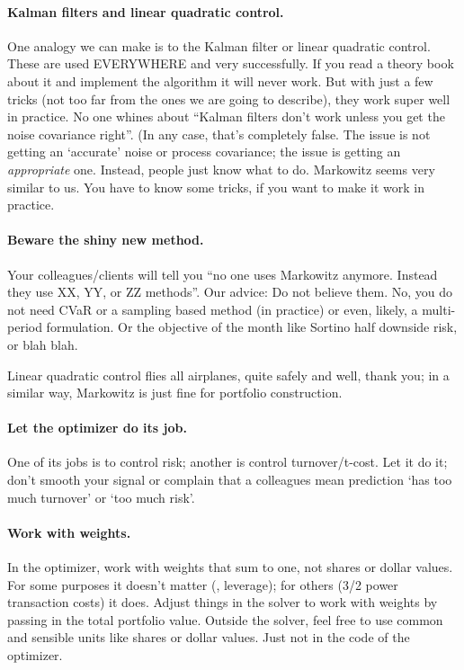 \documentclass[12pt]{article}
\begin{document}
\paragraph{Kalman filters and linear quadratic control.}
One analogy we can make is to the Kalman filter or linear quadratic control.   
These are used EVERYWHERE
and very successfully.  If you read a theory book about it and implement the
algorithm it will never work.  But with just a few tricks (not too far from the
ones we are going to describe), they work super well in practice. No one whines
about “Kalman filters don’t work unless you get the noise covariance right”.
(In any case, that's completely false.  The issue is not getting an `accurate' noise or 
process covariance; the issue is getting an \emph{appropriate} one.
Instead, people just know what to do.   Markowitz seems very similar to us. You
have to know some tricks, if you want to make it work in practice.

\paragraph{Beware the shiny new method.}  Your colleagues/clients will tell you “no one
uses Markowitz anymore. Instead they use XX, YY, or ZZ methods”.  Our advice:
Do not believe them.  No, you do not need CVaR or a sampling based method (in
practice) or even, likely, a multi-period formulation.
Or the objective of the month like Sortino half downside risk, or
blah blah.   

Linear quadratic control flies all airplanes, quite safely and
well, thank you; in a similar way, Markowitz is just fine for portfolio
construction.

\paragraph{Let the optimizer do its job.}   One of its jobs is to
control risk; another is control turnover/t-cost.  Let it do it; don’t smooth your
signal or complain that a colleagues mean prediction `has too much turnover' or `too much risk'. 

\paragraph{Work with weights.}
In the optimizer, work with weights that sum to one, not shares or dollar values.  For
some purposes it doesn’t matter (\eg, leverage); for others (3/2 power transaction
costs) it does.  Adjust things in the solver to work with weights by passing in
the total portfolio value.  Outside the solver, feel free to use common and
sensible units like shares or dollar values.  Just not in the code of the
optimizer.
\end{document}
